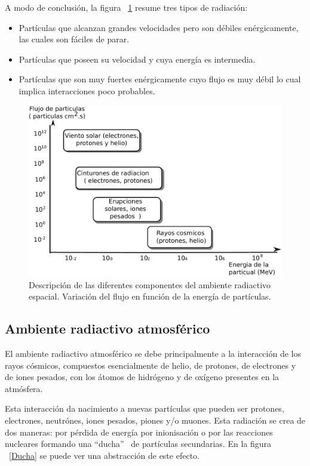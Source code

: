\documentclass[a4paper,openright,12pt]{report}
\begin{document}
A modo de conclusión, la figura ~\ref{anomalia} resume tres tipos de radiación:
\begin{itemize}
\item{} Partículas que  alcanzan grandes velocidades pero son débiles enérgicamente, las cuales son fáciles de parar.
\item{}Partículas que poseen su velocidad y cuya energía es intermedia. 
\item{}  Partículas que son muy fuertes enérgicamente cuyo flujo es muy débil lo cual implica interacciones poco probables.

\end{itemize}



\begin{figure}[H]
	\centering
	\includegraphics[width=0.75 \textwidth]{img/errores.pdf}
	\caption{Descripción de las diferentes componentes del ambiente radiactivo espacial. Variación del flujo en función de la energía de partículas.  }
	\label{anomalia}
\end{figure}



\subsection{Ambiente radiactivo atmosférico}

El ambiente radiactivo atmosférico se debe principalmente a la interacción de los rayos cósmicos, compuestos esencialmente de helio, de protones, de electrones y de iones pesados, con los átomos de hidrógeno y de oxígeno presentes en la atmósfera.

Esta interacción da nacimiento a nuevas partículas que pueden ser protones, electrones, neutrónes, iones pesados, piones y/o muones. Esta radiación se crea de dos maneras:  por pérdida de energía por inionisación o  por las reacciones nucleares formando una ``ducha'' \mbox{ }de partículas secundarias. En la figura ~\ref{Ducha} se puede ver una abstracción de este efecto.
\end{document}
